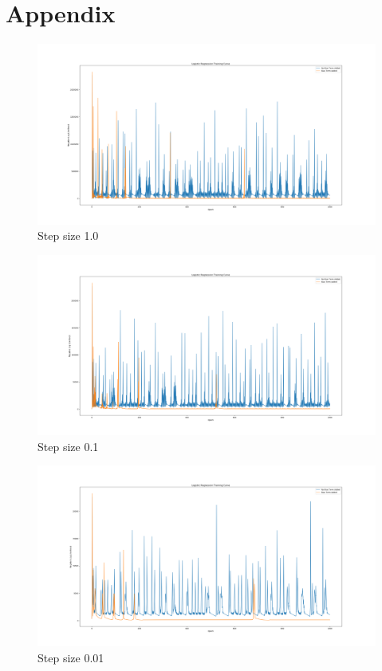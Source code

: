 \documentclass{article}
\begin{document}
    \section*{Appendix}
        \begin{figure}[h]
            \includegraphics[width=\textwidth]{"ss1.png"}
            \caption{Step size 1.0}
        \end{figure}
        \begin{figure}[!h]
            \includegraphics[width=\textwidth]{"ssp1.png"}
            \caption{Step size 0.1}
        \end{figure}
        \begin{figure}[!h]
            \includegraphics[width=\textwidth]{"ssp01.png"}
            \caption{Step size 0.01}
        \end{figure}
\end{document}
